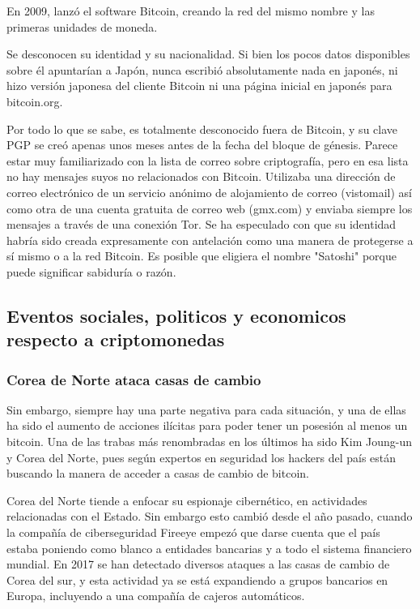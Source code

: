 \documentclass[12pt,letterpaper]{article}
\begin{document}
En 2009, lanz\'o el software Bitcoin, creando la red del mismo nombre y las primeras unidades de moneda.

Se desconocen su identidad y su nacionalidad. Si bien los pocos datos disponibles sobre \'el apuntar\'ian a Jap\'on, nunca escribi\'o absolutamente nada en japon\'es, ni hizo versi\'on japonesa del cliente Bitcoin ni una p\'agina inicial en japon\'es para bitcoin.org.

Por todo lo que se sabe, es totalmente desconocido fuera de Bitcoin, y su clave PGP se cre\'o apenas unos meses antes de la fecha del bloque de g\'enesis. Parece estar muy familiarizado con la lista de correo sobre criptograf\'ia, pero en esa lista no hay mensajes suyos no relacionados con Bitcoin. Utilizaba una direcci\'on de correo electr\'onico de un servicio an\'onimo de alojamiento de correo (vistomail) as\'i como otra de una cuenta gratuita de correo web (gmx.com) y enviaba siempre los mensajes a trav\'es de una conexi\'on Tor. Se ha especulado con que su identidad habr\'ia sido creada expresamente con antelaci\'on como una manera de protegerse a s\'i mismo o a la red Bitcoin. Es posible que eligiera el nombre "Satoshi" porque puede significar sabidur\'ia o raz\'on. 

            \subsection*{Eventos sociales, politicos y economicos respecto a criptomonedas}
           	\subsubsection*{Corea de Norte ataca casas de cambio}
           	Sin embargo, siempre hay una parte negativa para cada situaci\'on, y una de ellas ha sido el aumento de acciones il\'icitas para poder tener un posesi\'on al menos un bitcoin. Una de las trabas m\'as renombradas en los \'ultimos ha sido Kim Joung-un y Corea del Norte, pues seg\'un expertos en seguridad los hackers del pa\'is est\'an buscando la manera de acceder a casas de cambio de bitcoin.

Corea del Norte tiende a enfocar su espionaje cibern\'etico, en actividades relacionadas con el Estado. Sin embargo esto cambi\'o desde el año pasado, cuando la compañ\'ia de ciberseguridad Fireeye empez\'o que darse cuenta que el pa\'is estaba poniendo como blanco a entidades bancarias y a todo el sistema financiero mundial. En 2017 se han detectado diversos ataques a las casas de cambio de Corea del sur, y esta actividad ya se est\'a expandiendo a grupos bancarios en Europa, incluyendo a una compañ\'ia de cajeros autom\'aticos.
               
\end{document}
